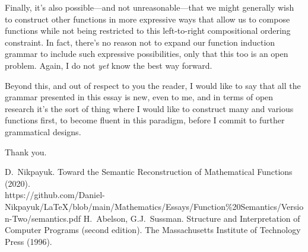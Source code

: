\documentclass[twoside]{article}
\begin{document}
Finally, it's also possible---and not unreasonable---that we might generally wish to construct other functions in more
expressive ways that allow us to compose functions while not being restricted to this left-to-right compositional
ordering constraint. In fact, there's no reason not to expand our function induction grammar to include such expressive
possibilities, only that this too is an open problem. Again, I do not \emph{yet} know the best way forward.

Beyond this, and out of respect to you the reader, I would like to say that all the grammar presented in this essay
is new, even to me, and in terms of open research it's the sort of thing where I would like to construct many
and various functions first, to become fluent in this paradigm, before I commit to further grammatical designs.

Thank you.

\vspace{\fill}

\begin{thebibliography}{99}
 D.~Nikpayuk. Toward the Semantic Reconstruction of Mathematical Functions (2020).\\
    https://github.com/Daniel-Nikpayuk/LaTeX/blob/main/Mathematics/Essays/Function\%20Semantics/Version-Two/semantics.pdf
 H.~Abelson, G.J.~Sussman. Structure and Interpretation of Computer Programs (second edition).
               The Massachusetts Institute of Technology Press (1996).
\end{thebibliography}
\end{document}
